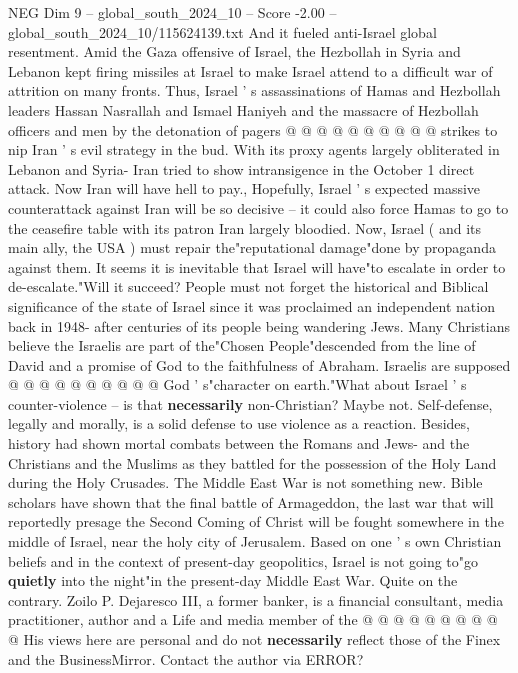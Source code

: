 \begin{textsample}{NEG Dim 9 – global\_south\_2024\_10 – Score -2.00 – global\_south\_2024\_10/115624139.txt}
And it fueled anti-Israel global resentment.
Amid the Gaza offensive of Israel, the Hezbollah in Syria and Lebanon kept firing missiles at Israel to make Israel attend to a difficult war of attrition on many fronts.
Thus, Israel ' s assassinations of Hamas and Hezbollah leaders Hassan Nasrallah and Ismael Haniyeh and the massacre of Hezbollah officers and men by the detonation of pagers @ @ @ @ @ @ @ @ @ @ strikes to nip Iran ' s evil strategy in the bud.
With its proxy agents largely obliterated in Lebanon and Syria- Iran tried to show intransigence in the October 1 direct attack.
Now Iran will have hell to pay., Hopefully, Israel ' s expected massive counterattack against Iran will be so decisive -- it could also force Hamas to go to the ceasefire table with its patron Iran largely bloodied.
Now, Israel ( and its main ally, the USA ) must repair the"reputational damage"done by propaganda against them.
It seems it is inevitable that Israel will have"to escalate in order to de-escalate."Will it succeed?
People must not forget the historical and Biblical significance of the state of Israel since it was proclaimed an independent nation back in 1948- after centuries of its people being wandering Jews.
Many Christians believe the Israelis are part of the"Chosen People"descended from the line of David and a promise of God to the faithfulness of Abraham.
Israelis are supposed @ @ @ @ @ @ @ @ @ @ God ' s"character on earth."What about Israel ' s counter-violence -- is that \textbf{necessarily} non-Christian?
Maybe not.
Self-defense, legally and morally, is a solid defense to use violence as a reaction.
Besides, history had shown mortal combats between the Romans and Jews- and the Christians and the Muslims as they battled for the possession of the Holy Land during the Holy Crusades.
The Middle East War is not something new.
Bible scholars have shown that the final battle of Armageddon, the last war that will reportedly presage the Second Coming of Christ will be fought somewhere in the middle of Israel, near the holy city of Jerusalem.
Based on one ' s own Christian beliefs and in the context of present-day geopolitics, Israel is not going to"go \textbf{quietly} into the night"in the present-day Middle East War.
Quite on the contrary.
Zoilo P.
Dejaresco III, a former banker, is a financial consultant, media practitioner, author and a Life and media member of the @ @ @ @ @ @ @ @ @ @ His views here are personal and do not \textbf{necessarily} reflect those of the Finex and the BusinessMirror.
Contact the author via ERROR?

\end{textsample}
